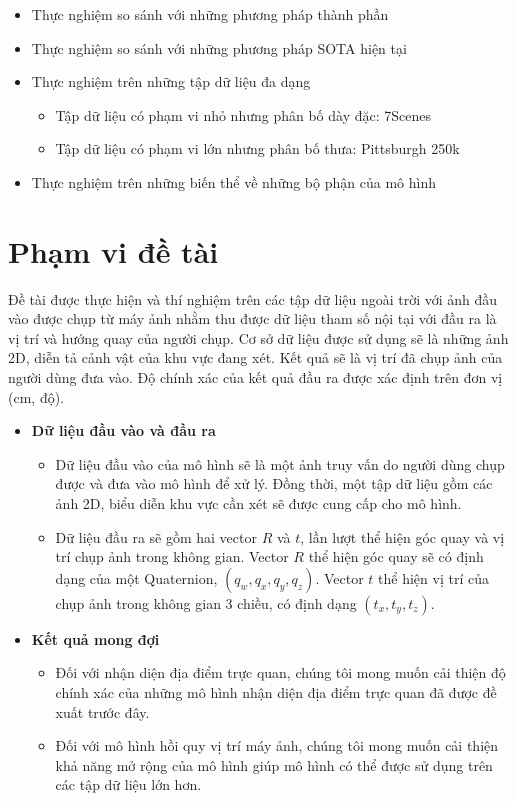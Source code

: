 \begin{itemize}
    \item Thực nghiệm so sánh với những phương pháp thành phần
    \item Thực nghiệm so sánh với những phương pháp SOTA hiện tại
    \item Thực nghiệm trên những tập dữ liệu đa dạng
          \begin{itemize}
              \item Tập dữ liệu có phạm vi nhỏ nhưng phân bố dày đặc: 7Scenes
              \item Tập dữ liệu có phạm vi lớn nhưng phân bố thưa: Pittsburgh 250k
          \end{itemize}
    \item Thực nghiệm trên những biến thể về những bộ phận của mô hình
\end{itemize}
\newpage
\section{Phạm vi đề tài}
Đề tài được thực hiện và thí nghiệm trên các tập dữ liệu ngoài trời với ảnh đầu vào được chụp từ máy ảnh nhằm thu được dữ liệu tham số nội tại với đầu ra là vị trí và hướng quay của người chụp. Cơ sở dữ liệu được sử dụng sẽ là những ảnh 2D, diễn tả cảnh vật của khu vực đang xét. Kết quả sẽ là vị trí đã chụp ảnh của người dùng đưa vào. Độ chính xác của kết quả đầu ra được xác định trên đơn vị (cm, độ).
\begin{itemize}
    \item \textbf{Dữ liệu đầu vào và đầu ra}
          \begin{itemize}
              \item Dữ liệu đầu vào của mô hình sẽ là một ảnh truy vấn do người dùng chụp được và đưa vào mô hình để xử lý. Đồng thời, một tập dữ liệu gồm các ảnh 2D, biểu diễn khu vực cần xét sẽ được cung cấp cho mô hình.
              \item Dữ liệu đầu ra sẽ gồm hai vector $R$ và $t$, lần lượt thể hiện góc quay và vị trí chụp ảnh trong không gian. Vector $R$ thể hiện góc quay sẽ có định dạng của một Quaternion, $(q_w,q_x,q_y,q_z)$. Vector $t$ thể hiện vị trí của chụp ảnh trong không gian 3 chiều, có định dạng $(t_x,t_y,t_z)$.
          \end{itemize}
    \item \textbf{Kết quả mong đợi}
          \begin{itemize}
              \item Đối với nhận diện địa điểm trực quan, chúng tôi mong muốn cải thiện độ chính xác của những mô hình nhận diện địa điểm trực quan đã được đề xuất trước đây.
              \item Đối với mô hình hồi quy vị trí máy ảnh, chúng tôi mong muốn cải thiện khả năng mở rộng của mô hình giúp mô hình có thể được sử dụng trên các tập dữ liệu lớn hơn.
          \end{itemize}
\end{itemize}


